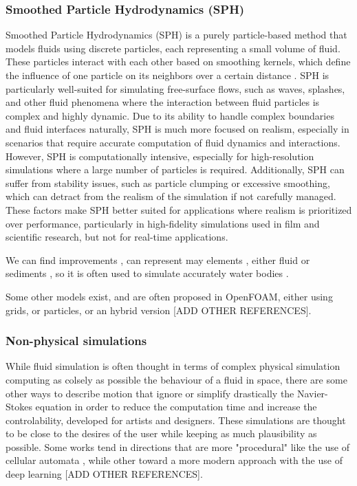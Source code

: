\subsubsection{Smoothed Particle Hydrodynamics (SPH)}

Smoothed Particle Hydrodynamics (SPH) \cite{Muller2003} is a purely particle-based method that models fluids using discrete particles, each representing a small volume of fluid. These particles interact with each other based on smoothing kernels, which define the influence of one particle on its neighbors over a certain distance \cite{Koschier2022}. SPH is particularly well-suited for simulating free-surface flows, such as waves, splashes, and other fluid phenomena where the interaction between fluid particles is complex and highly dynamic. Due to its ability to handle complex boundaries and fluid interfaces naturally, SPH is much more focused on realism, especially in scenarios that require accurate computation of fluid dynamics and interactions. However, SPH is computationally intensive, especially for high-resolution simulations where a large number of particles is required. Additionally, SPH can suffer from stability issues, such as particle clumping or excessive smoothing, which can detract from the realism of the simulation if not carefully managed. These factors make SPH better suited for applications where realism is prioritized over performance, particularly in high-fidelity simulations used in film and scientific research, but not for real-time applications.

We can find improvements \cite{Roose2011}, can represent may elements \cite{Iwasaki2010}, either fluid or sediments \cite{Lenaerts2009}, so it is often used to simulate accurately water bodies \cite{Nikeghabali2018}.

Some other models exist, and are often proposed in OpenFOAM, either using grids, or particles, or an hybrid version \cite{Caretto1973} [ADD OTHER REFERENCES]. 

\subsubsection{Non-physical simulations}
While fluid simulation is often thought in terms of complex physical simulation computing as colsely as possible the behaviour of a fluid in space, there are some other ways to describe motion that ignore or simplify drastically the Navier-Stokes equation in order to reduce the computation time and increase the controlability, developed for artists and designers. These simulations are thought to be close to the desires of the user while keeping as much plausibility as possible. Some works tend in directions that are more "procedural" like the use of cellular automata \cite{Boldea2009,Cattaneo2005}, while other toward a more modern approach with the use of deep learning \cite{Tompson2017} [ADD OTHER REFERENCES].



